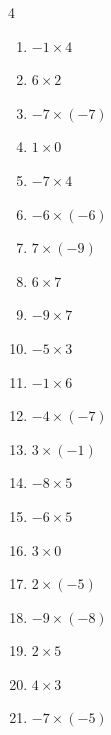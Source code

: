 \begin{multicols}{4}
\begin{enumerate}
  \item $-1\times 4$
        \phantom{$=-4$}

  \item $6\times 2$
        \phantom{$=12$}

  \item $-7\times (-7)$
        \phantom{$=49$}

  \item $1\times 0$
        \phantom{$=0$}

  \item $-7\times 4$
        \phantom{$=-28$}

  \item $-6\times (-6)$
        \phantom{$=36$}

  \item $7\times (-9)$
        \phantom{$=-63$}

  \item $6\times 7$
        \phantom{$=42$}

  \item $-9\times 7$
        \phantom{$=-63$}

  \item $-5\times 3$
        \phantom{$=-15$}

  \item $-1\times 6$
        \phantom{$=-6$}

  \item $-4\times (-7)$
        \phantom{$=28$}

  \item $3\times (-1)$
        \phantom{$=-3$}

  \item $-8\times 5$
        \phantom{$=-40$}

  \item $-6\times 5$
        \phantom{$=-30$}

  \item $3\times 0$
        \phantom{$=0$}

  \item $2\times (-5)$
        \phantom{$=-10$}

  \item $-9\times (-8)$
        \phantom{$=72$}

  \item $2\times 5$
        \phantom{$=10$}

  \item $4\times 3$
        \phantom{$=12$}

  \item $-7\times (-5)$
        \phantom{$=35$}


\end{enumerate}
\end{multicols}
